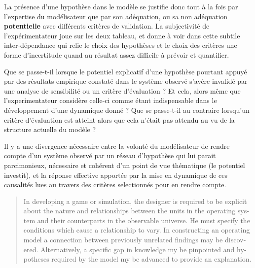 
La présence d'une hypothèse dans le modèle se justifie donc tout à la fois par l'expertise du modélisateur que par son adéquation, ou sa non adéquation \textbf{potentielle} avec différents critères de validation. La subjectivité de l'expérimentateur joue sur les deux tableau, et donne à voir dans cette subtile inter-dépendance qui relie le choix des hypothèses et le choix des critères une forme d'incertitude quand au résultat assez difficile à prévoir et quantifier.

Que se passe-t-il lorsque le potentiel explicatif d'une hypothèse pourtant appuyé par des résultats empirique constaté dans le système observé s'avére invalidé par une analyse de sensibilité ou un critère d'évaluation ? Et cela, alors même que l'experimentateur considère celle-ci comme étant indispensable dans le développement d'une dynamique donné ? Que se passe-t-il au contraire lorsqu'un critère d'évaluation est atteint alors que cela n'était pas attendu au vu de la structure actuelle du modèle ? 


Il y a une divergence nécessaire entre la volonté du modélisateur de rendre compte d'un système observé par un réseau d'hypothèse qui lui parait parcimonieux, nécessaire et cohérent d'un point de vue thématique (le potentiel investit), et la réponse effective apportée par la mise en dynamique de ces causalités lues au travers des critères selectionnés pour en rendre compte. %

\foreignblockquote{english}[{\cite[219]{Hermann1967}}]{In developing a game or simulation, the designer is required to be explicit about the nature and relationships between the units in the operating system and their counterparts in the observable universe. He must specify the conditions which cause a relationship to vary. In constructing an operating model a connection between previously unrelated findings may be discovered. Alternatively, a specific gap in knowledge my be pinpointed and hypotheses required by the model my be advanced to provide an explanation.} 

